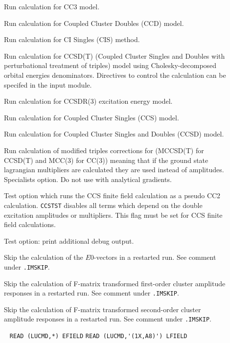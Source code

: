 \begin{description}
\item[]     
        Run calculation for CC3 model.
%
\item[]    
        Run calculation for Coupled Cluster Doubles
        (CCD) model. 
%
\item[]    
        Run calculation for CI Singles (CIS) method. 
%
\item[]  
        Run calculation for CCSD(T) (Coupled Cluster Singles and 
        Doubles with perturbational treatment of triples) model
        using Cholesky-decomposed orbital energies denominators.
        Directives to control the calculation can be specifed in the
         input module.
%
\item[] 
        Run calculation for CCSDR(3) excitation energy model.
%
\item[] 
        Run calculation for Coupled Cluster Singles
        (CCS) model. 
%
\item[]   
        Run calculation for Coupled Cluster Singles and Doubles
        (CCSD) model. 
%
\item[]   
        Run calculation of modified triples corrections for (MCCSD(T) for CCSD(T) and MCC(3) for CC(3))
        meaning that if the ground state lagrangian multipliers are calculated 
        they are used instead of amplitudes. Specialists option. 
        Do not use with analytical gradients. 
%
\item[] 
   Test option which runs the CCS finite field calculation as a pseudo CC2
   calculation. \verb+CCSTST+ disables all terms which depend on the
   double excitation amplitudes or multipliers. This flag must be
   set for CCS finite field calculations.
%
\item[]  
   Test option: print additional debug output.
%
\item[] 
   Skip the calculation of the $E0$-vectors 
   in a restarted run. See comment under \verb|.IMSKIP|.
%
\item[] 
   Skip the calculation of F-matrix transformed first-order
   cluster amplitude responses in a restarted run. See comment under \verb|.IMSKIP|.
%
\item[] 
   Skip the calculation of F-matrix transformed second-order
   cluster amplitude responses in a restarted run. See comment under \verb|.IMSKIP|.
%
\item[] \verb| |\newline
    \verb|READ (LUCMD,*) EFIELD|\newline
    \verb|READ (LUCMD,'(1X,A8)') LFIELD|


\end{description}
